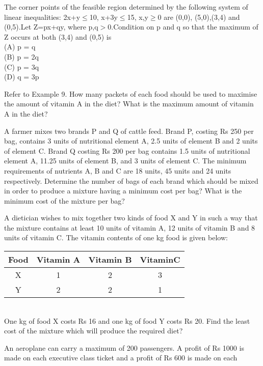 \item The corner points of the feasible region determined by the following system of
linear inequalities:
2x+y$\leq$10, x+3y$\leq$15, x,y$\geq$0 are (0,0), (5,0),(3,4) and (0,5).Let
Z=px+qy, where p,q$>$0.Condition on p and q so that the maximum of Z
occurs at both (3,4) and (0,5) is\\
(A) p = q\\
(B) p = 2q\\
(C) p = 3q\\
(D) q = 3p\\
\item Refer to Example 9. How many packets of each food should be used to maximise
the amount of vitamin A in the diet? What is the maximum amount of vitamin A
in the diet?\\
\item A farmer mixes two brands P and Q of cattle feed. Brand P, costing Rs 250 per
bag, contains 3 units of nutritional element A, 2.5 units of element B and 2 units
of element C. Brand Q costing Rs 200 per bag contains 1.5 units of nutritional
element A, 11.25 units of element B, and 3 units of element C. The minimum
requirements of nutrients A, B and C are 18 units, 45 units and 24 units respectively.
Determine the number of bags of each brand which should be mixed in order to
produce a mixture having a minimum cost per bag? What is the minimum cost of
the mixture per bag?\\
\item A dietician wishes to mix together two kinds of food X and Y in such a way that
the mixture contains at least 10 units of vitamin A, 12 units of vitamin B and
8 units of vitamin C. The vitamin contents of one kg food is given below:\\
\begin{tabular}{|c|c|c|c|}
\hline
\textbf{Food} &\textbf{Vitamin A} &\textbf{Vitamin B} & \textbf{VitaminC}\\
\hline
X & 1 & 2 & 3\\
\hline
Y &2 &2 &1\\
\hline


\end{tabular}\\
One kg of food X costs Rs 16 and one kg of food Y costs Rs 20. Find the least
cost of the mixture which will produce the required diet?\\
\item An aeroplane can carry a maximum of 200 passengers. A profit of Rs 1000 is
made on each executive class ticket and a profit of Rs 600 is made on each
